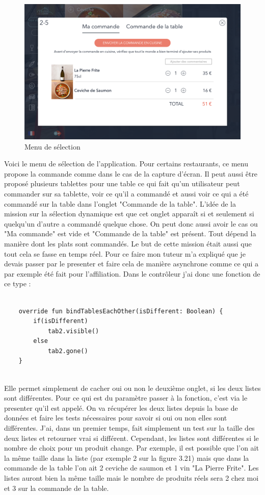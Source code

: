 \begin{figure}[!htb]
  \centering
  \includegraphics[width=115mm,scale=0.5]{images/selection.png}
  \caption{Menu de sélection}
  \label{fig:boat1}
\end{figure}

Voici le menu de sélection de l'application. Pour certains restaurants, ce menu propose la commande comme dans le cas de la capture d'écran. Il peut aussi être proposé plusieurs tablettes pour une table ce qui fait qu'un utilisateur peut commander sur sa tablette, voir ce qu'il a commandé et aussi voir ce qui a été commandé sur la table dans l'onglet "Commande de la table". L'idée de la mission sur la sélection dynamique est que cet onglet apparaît si et seulement si quelqu'un d'autre a commandé quelque chose. On peut donc aussi avoir le cas ou "Ma commande" est vide et "Commande de la table" est présent. Tout dépend la manière dont les plats sont commandés. Le but de cette mission était aussi que tout cela se fasse en temps réel. Pour ce faire mon tuteur m'a expliqué que je devais passer par le presenter et faire cela de manière asynchrone comme ce qui a par exemple été fait pour l'affiliation. Dans le contrôleur j'ai donc une fonction de ce type :

\begin{lstlisting}[frame=single]  % Start your code-block
    
    override fun bindTablesEachOther(isDifferent: Boolean) {
        if(isDifferent)
            tab2.visible()
        else
            tab2.gone()
    }
    
\end{lstlisting}

Elle permet simplement de cacher oui ou non le deuxième onglet, si les deux listes sont différentes. Pour ce qui est du paramètre passer à la fonction, c'est via le presenter qu'il est appelé. On va récupérer les deux listes depuis la base de données et faire les tests nécessaires pour savoir si oui ou non elles sont différentes. J'ai, dans un premier temps, fait simplement un test sur la taille des deux listes et retourner vrai si différent. Cependant, les listes sont différentes si le nombre de choix pour un produit change. Par exemple, il est possible que l'on ait la même taille dans la liste (par exemple 2 sur la figure 3.21) mais que dans la commande de la table l'on ait 2 ceviche de saumon et 1 vin "La Pierre Frite". Les listes auront bien la même taille mais le nombre de produits réels sera 2 chez moi et 3 sur la commande de la table.

